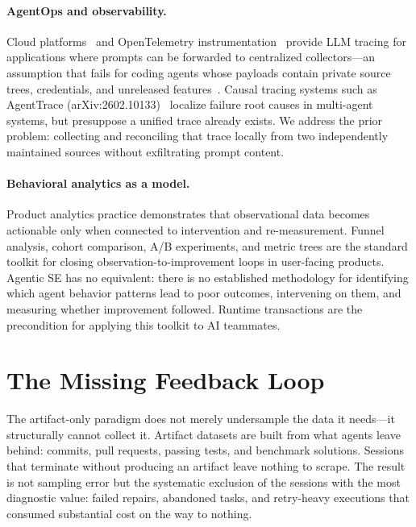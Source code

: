 \documentclass[sigconf,anonymous,review]{acmart}
\begin{document}
\paragraph{AgentOps and observability.}
Cloud platforms~\cite{langfuse, helicone, langsmith} and
OpenTelemetry instrumentation~\cite{openllmetry, otel-genai} provide
LLM tracing for applications where prompts can be forwarded to
centralized collectors---an assumption that fails for coding agents
whose payloads contain private source trees, credentials, and
unreleased features~\cite{infraagents2025}. Causal tracing systems
such as AgentTrace (arXiv:2602.10133)~\cite{agenttrace2026} localize
failure root causes in multi-agent systems, but presuppose a unified
trace already exists. We address the prior problem: collecting and
reconciling that trace locally from two independently maintained
sources without exfiltrating prompt content.

\paragraph{Behavioral analytics as a model.}
Product analytics practice demonstrates that observational data
becomes actionable only when connected to intervention and
re-measurement. Funnel analysis, cohort comparison, A/B experiments,
and metric trees are the standard toolkit for closing
observation-to-improvement loops in user-facing products. Agentic SE
has no equivalent: there is no established methodology for
identifying which agent behavior patterns lead to poor outcomes,
intervening on them, and measuring whether improvement followed.
Runtime transactions are the precondition for applying this toolkit
to AI teammates.

\section{The Missing Feedback Loop}
\label{sec:loop}

The artifact-only paradigm does not merely undersample the data it
needs---it structurally cannot collect it. Artifact datasets are
built from what agents leave behind: commits, pull requests, passing
tests, and benchmark solutions. Sessions that terminate without
producing an artifact leave nothing to scrape. The result is not
sampling error but the systematic exclusion of the sessions with the
most diagnostic value: failed repairs, abandoned tasks, and retry-heavy
executions that consumed substantial cost on the way to nothing.
\end{document}
